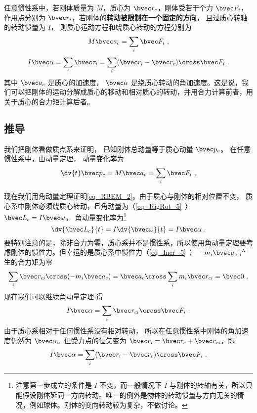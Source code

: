 

任意惯性系中，若刚体质量为 $M$，质心为 $\bvec r_c$，刚体受若干个力 $\bvec F_i$，作用点分别为 $\bvec r_i$，若刚体的\textbf{转动被限制在一个固定的方向}， 且过质心转轴的转动惯量为 $I$， 则质心运动方程和绕质心转动的方程分别为
\begin{equation}\label{eq_RBEM_1}
M\bvec a_c = \sum_i \bvec F_i~,
\end{equation}
\begin{equation}\label{eq_RBEM_2}
I \bvec \alpha = \sum_i \bvec \tau_i = \sum_i (\bvec r_i-\bvec r_c) \cross  \bvec F_i~.
\end{equation}
其中 $\bvec a_c$ 是质心的加速度， $\bvec \alpha$ 是绕质心转动的角加速度。这是说，我们可以把刚体的运动分解成质心的移动和相对质心的转动，并用合力计算前者，用关于质心的合力矩计算后者。

\subsection{推导}
我们把刚体看做质点系来证明， 已知刚体总动量等于质心动量 $\bvec p_c$。 在任意惯性系中，由动量定理， 动量变化率为
\begin{equation}
\dv{t} \bvec p_c = M \bvec a_c = \sum_i \bvec F_i~,
\end{equation}

现在我们用角动量定理证明\autoref{eq_RBEM_2}。由于质心与刚体的相对位置不变，%
质心系中刚体必须绕质心转动，且角动量为（\autoref{eq_RigRot_5}~） $\bvec L_c = I \bvec\omega$， 角动量变化率为\footnote{注意第一步成立的条件是 $I$ 不变，而一般情况下 $I$ 与刚体的转轴有关，所以只能假设刚体延同一方向转动。唯一的例外是物体的转动惯量与方向无关的情况，例如球体。刚体的变向转动较为复杂，不做讨论。}
\begin{equation}
\dv{\bvec L_c}{t} = I \dv{\bvec \omega}{t} = I \bvec\alpha~.
\end{equation}
要特别注意的是，除非合力为零，质心系并不是惯性系，所以使用角动量定理要考虑刚体的惯性力。但幸运的是质心系中惯性力（\autoref{eq_Iner_5}~） $-m_i \bvec a_c$ 产生的合力矩为零
\begin{equation}
\sum_i \bvec r_{ci}\cross (-m_i \bvec a_{c}) = \bvec a_{c} \cross \sum_i m_i \bvec r_{ci} = \bvec 0~.
\end{equation}
现在我们可以继续角动量定理 得
\begin{equation}
I \bvec\alpha = \sum_i \bvec r_{ci} \cross  \bvec F_i~.
\end{equation}
由于质心系相对于任何惯性系没有相对转动， 所以在任意惯性系中刚体的角加速度仍然为 $\bvec\alpha$。但受力点的位矢变为 $\bvec r_i = \bvec r_c + \bvec r_{ci}$，即
\begin{equation}\label{eq_RBEM_7}
I \bvec \alpha = \sum_i (\bvec r_i-\bvec r_c) \cross  \bvec F_i~.
\end{equation}

